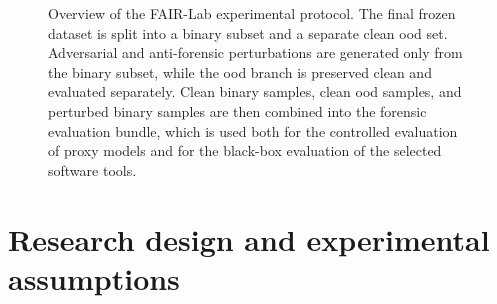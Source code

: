 \begin{figure}[H]
{%
}
\caption[FAIR-Lab experimental protocol overview]{Overview of the FAIR-Lab experimental protocol. The final frozen dataset is split into a binary subset and a separate clean \gls{ood} set. Adversarial and anti-forensic perturbations are generated only from the binary subset, while the \gls{ood} branch is preserved clean and evaluated separately. Clean binary samples, clean \gls{ood} samples, and perturbed binary samples are then combined into the forensic evaluation bundle, which is used both for the controlled evaluation of proxy models and for the black-box evaluation of the selected software tools.}
\label{fig:methodology-fairlab-overview}
\end{figure}


\section{Research design and experimental assumptions}
\label{sec:methodology-research-design}

